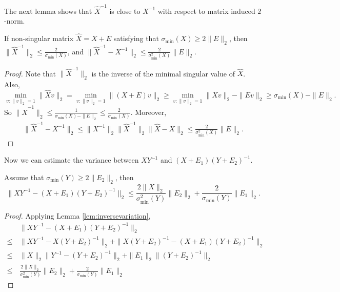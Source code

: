The next lemma shows that $\hat{X}^{-1}$ is close to $X^{-1}$ with respect to  matrix induced $2$-norm.
\begin{lemma}
\label{lem:inversevariation}
If non-singular matrix $\hat{X} = X+E$ satisfying that $\sigma_{\min}(X)\ge2\|E\|_2$, then $\|\hat{X}^{-1}\|_2 \le \frac{2}{\sigma_{\min}(X)}$, and $\|\hat{X}^{-1} - X^{-1} \|_2 \le \frac{2}{\sigma_{\min}^2(X)}\|E\|_2$.
\end{lemma} 
\begin{proof}
Note that $\|\hat{X}^{-1}\|_2$ is the inverse of the minimal singular value of $\hat{X}$. Also, 
\[
 \min_{v:\|v\|_2=1} \|\hat{X}v\|_2 = \min_{v:\|v\|_2=1}\|(X+E)v\|_2 \ge \min_{v:\|v\|_2=1} \|Xv\|_2 - \|Ev\|_2 \ge \sigma_{\min}(X) - \|E\|_2.
\]
So $\|\hat{X}^{-1}\|_2 \le \frac{1}{\sigma_{\min}(X) - \|E\|_2} \le \frac{2}{\sigma_{\min}(X)}$. Moreover,
\begin{align*}
\|\hat{X}^{-1} - X^{-1} \|_2 \le \|X^{-1}\|_2\|\hat{X}^{-1}\|_2\|\hat{X} - X\|_2
\le \frac{2}{\sigma_{\min}^2(X)}\|E\|_2.
\end{align*}
\end{proof}
Now we can estimate the variance between $XY^{-1}$ and $(X+E_1)(Y+E_2)^{-1}$.
\begin{lemma}
\label{lem:Mvariation}
Assume that $\sigma_{\min}(Y)\ge2\|E_2\|_2$, then
\[
\| XY^{-1} - (X+E_1)(Y+E_2)^{-1}\|_2 \le \frac{2\|X\|_2}{\sigma_{\min}^2(Y)}\|E_2\|_2 + \frac{2}{\sigma_{\min}(Y)}\|E_1\|_2.
\]
\end{lemma}
\begin{proof}
Applying Lemma \ref{lem:inversevariation},
\begin{align*}
	& \| XY^{-1} - (X+E_1)(Y+E_2)^{-1}\|_2 \\
\le\, & \| XY^{-1} - X(Y+E_2)^{-1}\|_2 + \| X(Y+E_2)^{-1} - (X+E_1)(Y+E_2)^{-1}\|_2 \\
\le\, & \|X\|_2\| Y^{-1} - (Y+E_2)^{-1}\|_2 + \|E_1\|_2\|(Y+E_2)^{-1}\|_2\\
\le\, & \frac{2\|X\|_2}{\sigma_{\min}^2(Y)}\|E_2\|_2 + \frac{2}{\sigma_{\min}(Y)}\|E_1\|_2
\end{align*}
\end{proof}


